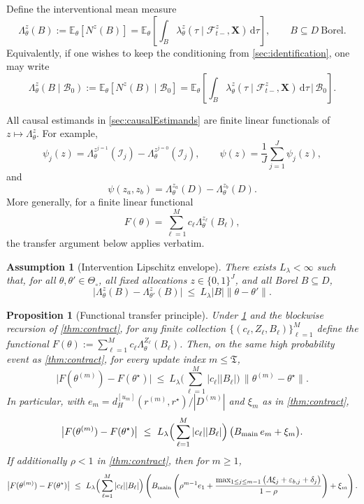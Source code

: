 \documentclass{statsoc}
\newtheorem{proposition}[proposition]{Proposition}
\newtheorem{assumption}[assumption]{Assumption}
\newcommand{\bbE}{\mathbb{E}}
\newcommand{\dd}{\mathrm{d}}
\newcommand{\1}{\mathbbm{1}}
\newcommand{\CovX}{\mathbf{X}}
\newcommand{\Nproc}{N}
\newcommand{\Tmax}{\mathfrak{T}}
\begin{document}
Define the interventional mean measure
\[
\Lambda_\theta^z(B)
:=
\bbE_\theta\!\left[\Nproc^z(B)\right]
=
\bbE_\theta\!\left[
\int_B \lambda_\theta^z(\tau\mid \mathcal F_{t-}^z,\CovX)\,\dd\tau
\right],
\qquad B\subseteq D\ \text{Borel}.
\]
Equivalently, if one wishes to keep the conditioning from \cref{sec:identification}, one may write
\[
\Lambda_\theta^z(B\mid \mathcal B_0)
:=
\bbE_\theta\!\left[\Nproc^z(B)\mid \mathcal B_0\right]
=
\bbE_\theta\!\left[
\int_B \lambda_\theta^z(\tau\mid \mathcal F_{t-}^z,\CovX)\,\dd\tau
\,\Big|\, \mathcal B_0
\right].
\]

All causal estimands in \cref{sec:causalEstimands} are finite linear functionals of \(z\mapsto \Lambda_\theta^z\). For example,
\[
\psi_j(z)=\Lambda_\theta^{z^{j=1}}(\mathcal I_j)-\Lambda_\theta^{z^{j=0}}(\mathcal I_j),
\qquad
\psi(z)=\frac{1}{J}\sum_{j=1}^J \psi_j(z),
\]
and
\[
\psi(z_a,z_b)
=
\Lambda_\theta^{z_a}(D)-\Lambda_\theta^{z_b}(D).
\]
More generally, for a finite linear functional
\[
F(\theta)=\sum_{\ell=1}^M c_\ell \Lambda_\theta^{z_\ell}(B_\ell),
\]
the transfer argument below applies verbatim.

\begin{assumption}[Intervention Lipschitz envelope]\label{ass:Lambda-Lip}
There exists \(L_\lambda<\infty\) such that, for all \(\theta,\theta'\in\Theta_\circ\), all fixed allocations \(z\in\{0,1\}^J\),
and all Borel \(B\subseteq D\),
\begin{equation}\label{eq:Lambda-Lip}
\big| \Lambda_\theta^z(B)-\Lambda_{\theta'}^z(B) \big|
\ \le\ L_\lambda |B| \|\theta-\theta'\|.
\end{equation}
\end{assumption}

\begin{proposition}[Functional transfer principle]\label{prop:transfer-functional}
Under \cref{ass:Lambda-Lip} and the blockwise recursion of \cref{thm:contract}, for any finite collection
$\{(c_\ell,Z_\ell,B_\ell)\}_{\ell=1}^M$ define the functional
$F(\theta):=\sum_{\ell=1}^M c_\ell \Lambda_\theta^{Z_\ell}(B_\ell)$.
Then, on the same high probability event as \cref{thm:contract}, for every update index $m\le \Tmax$,
\[
\big| F(\theta^{(m)})-F(\theta^\star) \big|
\ \le\ L_\lambda \Big(\sum_{\ell=1}^M |c_\ell| |B_\ell|\Big)\,\|\theta^{(m)}-\theta^\star\|.
\]
In particular, with $e_m=d_H^{[u_m]}(r^{(m)},r^\star)/|D^{(m)}|$ and $\xi_m$ as in \cref{thm:contract},
\[
\big| F(\theta^{(m)})-F(\theta^\star) \big|
\ \le\ L_\lambda \Big(\sum_{\ell=1}^M |c_\ell| |B_\ell|\Big)\,\big(B_{\rm main}\,e_m+\xi_m\big).
\]
If additionally $\rho<1$ in \cref{thm:contract}, then for $m\ge 1$,
\[
\big| F(\theta^{(m)})-F(\theta^\star) \big|
\ \le\ L_\lambda \Big(\sum_{\ell=1}^M |c_\ell| |B_\ell|\Big)\left(
B_{\rm main}\left(\rho^{m-1}e_1+\frac{\max_{1\le j\le m-1}\big(A\xi_j+\varepsilon_{b,j}+\delta_j\big)}{1-\rho}\right)+\xi_m\right).
\]
\end{proposition}
\end{document}
